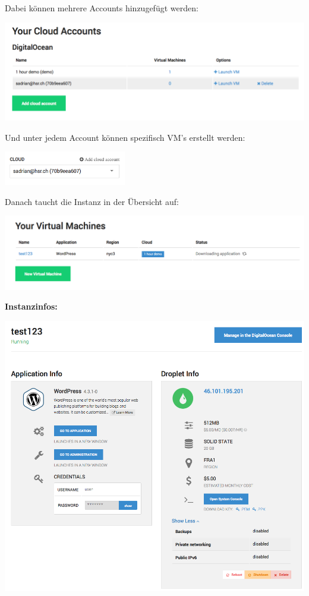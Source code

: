Dabei können mehrere Accounts hinzugefügt werden:

\includegraphics[width=\textwidth]{./03_Analyse/03_Bitnami/images/digitalocean_accounts}

Und unter jedem Account können spezifisch VM's erstellt werden:

\includegraphics[width=0.4\textwidth]{./03_Analyse/03_Bitnami/images/digitalocean_account_specific}

Danach taucht die Instanz in der Übersicht auf:

\includegraphics[width=\textwidth]{./03_Analyse/03_Bitnami/images/digitalocean_instances}

\newpage
\textbf{Instanzinfos:}

\includegraphics[width=\textwidth]{./03_Analyse/03_Bitnami/images/digitalocean_instanceinfo}

